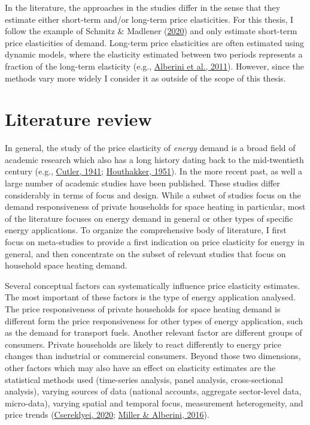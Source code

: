 \documentclass[12pt,twoside]{reedthesis}
\begin{document}
In the literature, the approaches in the studies differ in the sense that they estimate either short-term and/or long-term price elasticities. For this thesis, I follow the example of Schmitz \& Madlener (\protect\hyperlink{ref-schmitz_madlener20}{2020}) and only estimate short-term price elasticities of demand. Long-term price elasticities are often estimated using dynamic models, where the elasticity estimated between two periods represents a fraction of the long-term elasticity (e.g., \protect\hyperlink{ref-alberini_etal11}{Alberini et al., 2011}). However, since the methods vary more widely I consider it as outside of the scope of this thesis.

\hypertarget{review}{%
\section{Literature review}\label{review}}

In general, the study of the price elasticity of \emph{energy} demand is a broad field of academic research which also has a long history dating back to the mid-twentieth century (e.g., \protect\hyperlink{ref-cutler41}{Cutler, 1941}; \protect\hyperlink{ref-houthakker51}{Houthakker, 1951}). In the more recent past, as well a large number of academic studies have been published. These studies differ considerably in terms of focus and design. While a subset of studies focus on the demand responsiveness of private households for space heating in particular, most of the literature focuses on energy demand in general or other types of specific energy applications. To organize the comprehensive body of literature, I first focus on meta-studies to provide a first indication on price elasticity for energy in general, and then concentrate on the subset of relevant studies that focus on household space heating demand.

Several conceptual factors can systematically influence price elasticity estimates. The most important of these factors is the type of energy application analysed. The price responsiveness of private households for space heating demand is different form the price responsiveness for other types of energy application, such as the demand for transport fuels. Another relevant factor are different groups of consumers. Private households are likely to react differently to energy price changes than industrial or commercial consumers. Beyond those two dimensions, other factors which may also have an effect on elasticity estimates are the statistical methods used (time-series analysis, panel analysis, cross-sectional analysis), varying sources of data (national accounts, aggregate sector-level data, micro-data), varying spatial and temporal focus, measurement heterogeneity, and price trends (\protect\hyperlink{ref-csereklyei20}{Csereklyei, 2020}; \protect\hyperlink{ref-miller_alberini16}{Miller \& Alberini, 2016}).
\end{document}
